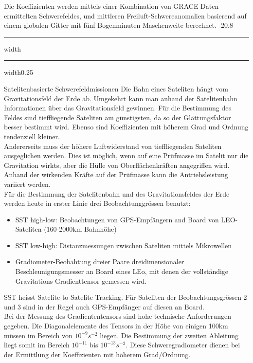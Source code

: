 \documentclass[9pt, landscape, fleqn]{scrartcl}
\makeatletter
\renewcommand{\subsection}{\@startsection{subsection}{1}{0mm}%
{-2\baselineskip}{0.8\baselineskip}%
{\hrule depth 0.2pt width\columnwidth\hrule depth0.75pt
width0.25\columnwidth\vspace*{1.2em}\large\bfseries\rmfamily}}
\makeatother
\begin{document}
\begin{multicols*}{3}
Die Koeffizienten werden mittels einer Kombination von GRACE Daten ermittelten Schwerefeldes, und mittleren Freiluft-Schwereanomalien basierend auf einem globalen Gitter mit fünf Bogenminuten Maschenweite berechnet.
\subsection{Satelitenbasierte Schwerefeldmissionen}
Die Bahn eines Sateliten hängt vom Gravitationsfeld der Erde ab. Umgekehrt kann man anhand der Satelitenbahn Informationen über das Gravitationsfeld gewinnen. Für die Bestimmung des Feldes sind tieffliegende Sateliten am günstigsten, da so der Glättungsfaktor besser bestimmt wird. Ebenso sind Koeffizienten mit höherem Grad und Ordnung tendenziell kleiner. \\

Andererseits muss der höhere Luftwiderstand von tieffliegenden Sateliten ausgeglichen werden. Dies ist möglich, wenn auf eine Prüfmasse im Satelit nur die Gravitation wirkts, aber die Hülle von Oberflächenkräften angegriffen wird. Anhand der wirkenden Kräfte auf der Prüfmasse kann die Antriebsleistung variiert werden. \\

Für die Bestimmung der Satelitenbahn und des Gravitationsfeldes der Erde werden heute in erster Linie drei Beobachtunggrössen benutzt:
\begin{itemize}
    \item SST high-low: Beobachtungen von GPS-Empfängern and Board von LEO-Sateliten (160-2000km Bahnhöhe)
    \item SST low-high: Distanzmessungen zwischen Sateliten mittels Mikrowellen
    \item Gradiometer-Beobahtung dreier Paare dreidimensionaler Beschleunigungsmesser an Board eines LEo, mit denen der vollständige Gravitations-Gradienttensor gemessen wird.
\end{itemize}
SST heisst Satelite-to-Satelite Tracking. Für Sateliten der Beobachtungsgrössen 2 und 3 sind in der Regel auch GPS-Empfänger auf diesen an Board. \\

Bei der Messung des Gradiententensors sind hohe technische Anforderungen gegeben. Die Diagonalelemente des Tensors in der Höhe von einigen 100km müssen im Bereich von $10^{-9} s^{-2}$ liegen. Die Bestimmung der zweiten Ableitung liegt somit im Bereich $10^{-11}$ bis $10^{-13} s^{-2}$. Diese Schweregradiometer dienen bei der Ermittlung der Koeffizienten mit höherem Grad/Ordnung. \\


\end{multicols*}
\end{document}
